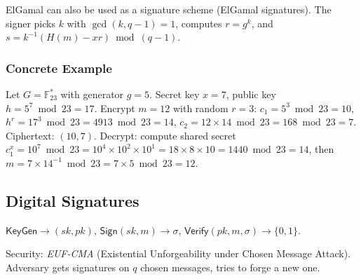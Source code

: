 ElGamal can also be used as a signature scheme (ElGamal signatures). The signer picks $k$ with $\gcd(k, q-1) = 1$, computes $r = g^k$, and $s = k^{-1}(H(m) - xr) \bmod (q-1)$.

\subsubsection*{Concrete Example}
Let $G = \mathbb{F}_{23}^*$ with generator $g = 5$. Secret key $x = 7$, public key $h = 5^7 \bmod 23 = 17$. Encrypt $m = 12$ with random $r = 3$: $c_1 = 5^3 \bmod 23 = 10$, $h^r = 17^3 \bmod 23 = 4913 \bmod 23 = 14$, $c_2 = 12 \times 14 \bmod 23 = 168 \bmod 23 = 7$. Ciphertext: $(10, 7)$. Decrypt: compute shared secret $c_1^x = 10^7 \bmod 23 = 10^4 \times 10^2 \times 10^1 = 18 \times 8 \times 10 = 1440 \bmod 23 = 14$, then $m = 7 \times 14^{-1} \bmod 23 = 7 \times 5 \bmod 23 = 12$.

\subsection{Digital Signatures}
\label{sec:crypto:signatures}

\begin{definition}
$\mathsf{KeyGen} \to (sk, pk)$, $\mathsf{Sign}(sk, m) \to \sigma$, $\mathsf{Verify}(pk, m, \sigma) \to \{0,1\}$.
\end{definition}

Security: \emph{EUF-CMA} (Existential Unforgeability under Chosen Message Attack). Adversary gets signatures on $q$ chosen messages, tries to forge a new one.

